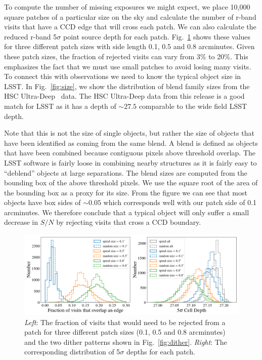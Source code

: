 \documentclass[fleqn,useAMS,usenatbib]{mnras}
\begin{document}
To compute the number of missing exposures we might expect, we place 10,000 
square patches of a particular size on the sky and calculate the number of 
r-band visits that have a CCD edge that will cross each patch.  We can also calculate 
the reduced r-band 5$\sigma$ point source depth for each patch.  Fig.~\ref{fig:cell} 
shows these values for three different patch sizes with side length 0.1, 0.5 
and 0.8 arcminutes. Given these patch sizes, the fraction of rejected visits 
can vary from 3$\%$ to 20$\%$.  This emphasizes the fact that we must use small 
patches to avoid losing many visits.  
To connect this with observations we need to know the typical object size in 
LSST.  In Fig.~\ref{fig:size}, we show the distribution of blend family sizes 
from the HSC Ultra-Deep~\citep{SurveyOverview} data.  The HSC Ultra-Deep data from this release
 is a good match for LSST as it has a depth of $\sim 27.5$ comparable to the wide field LSST depth.

Note that this is not the size of single 
objects, but rather the size of objects that have been identified as coming 
from the same blend.  A blend is defined as objects that have been combined 
because contiguous pixels above threshold overlap.  The LSST software is fairly 
loose in combining nearby structures as it is fairly easy to ``deblend'' objects 
at large separations.  
The blend sizes are computed from the bounding box of the above threshold 
pixels.  We use the square root of the area of the bounding box as a proxy for 
its size.  From the figure we can see that most objects have box sides of 
$\sim 0.05$ which corresponds well with our patch side of 0.1 arcminutes.  We 
therefore conclude that a typical object will only suffer a small 
decrease in $S/N$ by rejecting visits that cross a CCD boundary.

\begin{figure}
\includegraphics[width=\textwidth]{cell.png}
\caption{
{\it Left}: The fraction of visits that would need to be rejected from a patch for three 
different patch sizes (0.1, 0.5 and 0.8 arcminutes) and the two dither patterns 
shown in Fig.~\ref{fig:dither}.  {\it Right}:  The corresponding distribution 
of 5$\sigma$ depths for each patch. }
\label{fig:cell}
\end{figure}
\end{document}
